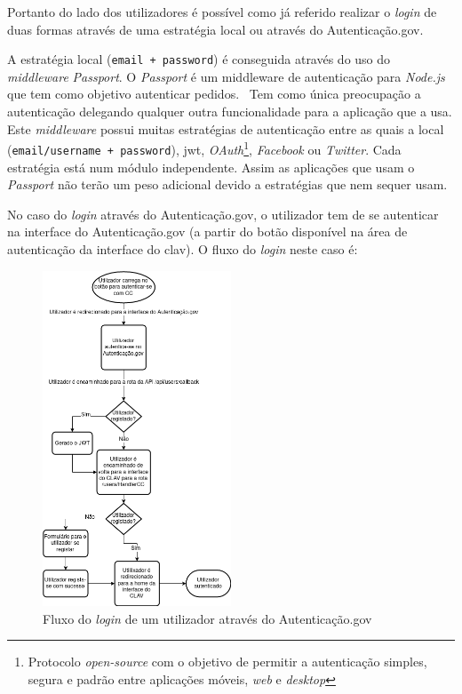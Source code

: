 Portanto do lado dos utilizadores é possível como já referido realizar o \textit{login} de duas formas através de uma estratégia local ou através do Autenticação.gov.

A estratégia local (\texttt{email + password}) é conseguida através do uso do \textit{middleware} \textit{Passport}.
O \textit{Passport} é um middleware de autenticação para \textit{Node.js} que tem como objetivo autenticar pedidos.~\cite{passport} Tem como única preocupação a autenticação delegando qualquer outra funcionalidade para a aplicação que a usa. Este \textit{middleware} possui muitas estratégias de autenticação entre as quais a local (\texttt{email/username + password}), \acrshort{jwt}, \textit{OAuth}\footnote{Protocolo \textit{open-source} com o objetivo de permitir a autenticação simples, segura e padrão entre aplicações móveis, \textit{web} e \textit{desktop}}, \textit{Facebook} ou \textit{Twitter}. Cada estratégia está num módulo independente. Assim as aplicações que usam o \textit{Passport} não terão um peso adicional devido a estratégias que nem sequer usam.

No caso do \textit{login} através do Autenticação.gov, o utilizador tem de se autenticar na interface do Autenticação.gov (a partir do botão disponível na área de autenticação da interface do \acrshort{clav}). O fluxo do \textit{login} neste caso é: 

\begin{figure}[H]
    \begin{center}
        \includegraphics[width=0.5\textwidth]{img/authgov.png}
    \end{center}
    \caption{Fluxo do \textit{login} de um utilizador através do Autenticação.gov}\label{fig:authgov}
\end{figure}

